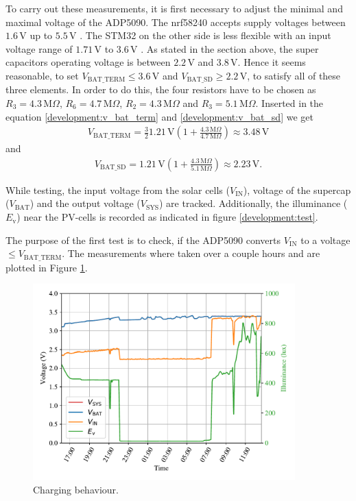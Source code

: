 To carry out these measurements, it is first necessary to adjust the minimal and maximal voltage of the ADP5090.
The nrf58240 accepts supply voltages between $1.6\,\text{V}$ up to $5.5\,\text{V}$ \cite{nrf}.
The STM32 on the other side is less flexible with an input voltage range of $1.71\,\text{V}$ to $3.6\,\text{V}$ \cite{stm32}.
As stated in the section above, the super capacitors operating voltage is between $2.2\,\text{V}$ and $3.8\,\text{V}$.
Hence it seems reasonable, to set $V_{\text{BAT\_TERM}} \le 3.6\,\text{V}$ and $V_{\text{BAT\_SD}} \ge 2.2\,\text{V}$, to satisfy all of these three elements.
In order to do this, the four resistors have to be chosen as $R_3 = 4.3\,\text{M}\Omega$, $R_6 = 4.7\,\text{M}\Omega$, $R_2 = 4.3\,\text{M}\Omega$ and $R_3 = 5.1\,\text{M}\Omega$.
Inserted in the equation \eqref{development:v_bat_term} and \eqref{development:v_bat_sd} we get
\begin{align}
	V_{\text{BAT\_TERM}}= \frac{3}{2} 1.21\,\text{V} \left(1 + \frac{4.3\,\text{M}\Omega}{4.7 \,\text{M}\Omega} \right) \approx 3.48\,\text{V} 
\end{align}
and
\begin{align}
	V_{\text{BAT\_SD}} = 1.21\,\text{V} \left(1 + \frac{4.3\,\text{M}\Omega}{5.1\,\text{M}\Omega} \right) \approx 2.23\,\text{V}. 
\end{align}

While testing, the input voltage from the solar cells ($V_{\text{IN}}$), voltage of the supercap ($V_{\text{BAT}}$) and the output voltage ($V_{\text{SYS}}$) are tracked. Additionally, the illuminance ($E_\text{v}$) near the PV-cells  is recorded as indicated in figure \ref{development:test}.

The purpose of the first test is to check, if the ADP5090 converts $V_{\text{IN}}$ to a voltage $\le V_{\text{BAT\_TERM}}$.
The measurements where taken over a couple hours and are plotted in Figure \ref{development:charge}.

\begin{figure}[ht]
	\centering
	\includegraphics[width=0.9\textwidth]{4-development/hardware/graphics/laden.pdf}
	\caption{Charging behaviour.\label{development:charge}}
\end{figure}

